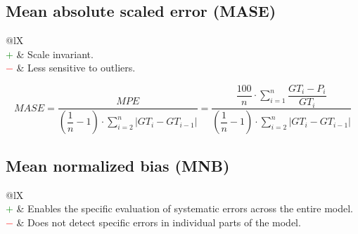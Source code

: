 \documentclass{article}
\begin{document}
\subsection[Mean absolute scaled error (MASE)]{Mean absolute scaled error (MASE) \cite{hyndman2006another, mohan2018deep}}

\begin{table}[H]\centering
    \begin{tabularx}{\textwidth}{@{}lX}
        \multicolumn{2}{@{}X}{Mean absolute error of the measurements scaled by the mean absolute error of the ground truth. (range: $[0, \infty)$)} \\
        \textcolor{Green}{$+$} & Scale invariant. \\
        \textcolor{Red}{$-$}   & Less sensitive to outliers.
    \end{tabularx}
\end{table}

\begin{equation}
    \textit{MASE} = \dfrac{\textit{MPE}}{\left(\dfrac{1}{n} - 1\right) \cdot \sum\nolimits_{i = 2}^n |\textit{GT}_i - \textit{GT}_{i - 1}|} = \dfrac{\dfrac{100}{n} \cdot \sum\nolimits_{i = 1}^n \dfrac{\textit{GT}_i - P_i}{\textit{GT}_i}}{\left(\dfrac{1}{n} - 1\right) \cdot \sum\nolimits_{i = 2}^n |\textit{GT}_i - \textit{GT}_{i - 1}|}
%
    \label{equation:MASE}
\end{equation}


\subsection[Mean normalized bias (MNB)]{Mean normalized bias (MNB) \cite{yu2006new, tsigaridis2014aerocom}}

\begin{table}[H]\centering
    \begin{tabularx}{\textwidth}{@{}lX}
         \\
        \textcolor{Green}{$+$} & Enables the specific evaluation of systematic errors across the entire model. \\
        \textcolor{Red}{$-$}   & Does not detect specific errors in individual parts of the model.
    \end{tabularx}
\end{table}
\end{document}
